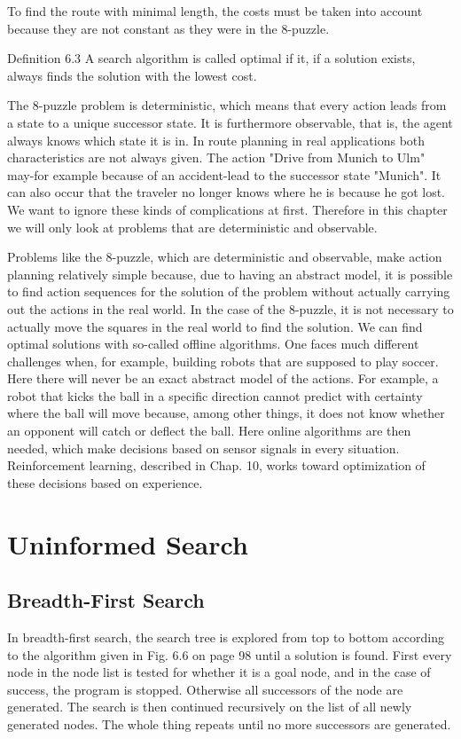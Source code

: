 \documentclass[10pt]{book}
\begin{document}
To find the route with minimal length, the costs must be taken into account because they are not constant as they were in the 8-puzzle.

Definition 6.3 A search algorithm is called optimal if it, if a solution exists, always finds the solution with the lowest cost.

The 8-puzzle problem is deterministic, which means that every action leads from a state to a unique successor state. It is furthermore observable, that is, the agent always knows which state it is in. In route planning in real applications both characteristics are not always given. The action "Drive from Munich to Ulm" may-for example because of an accident-lead to the successor state "Munich". It can also occur that the traveler no longer knows where he is because he got lost. We want to ignore these kinds of complications at first. Therefore in this chapter we will only look at problems that are deterministic and observable.

Problems like the 8-puzzle, which are deterministic and observable, make action planning relatively simple because, due to having an abstract model, it is possible to find action sequences for the solution of the problem without actually carrying out the actions in the real world. In the case of the 8-puzzle, it is not necessary to actually move the squares in the real world to find the solution. We can find optimal solutions with so-called offline algorithms. One faces much different challenges when, for example, building robots that are supposed to play soccer. Here there will never be an exact abstract model of the actions. For example, a robot that kicks the ball in a specific direction cannot predict with certainty where the ball will move because, among other things, it does not know whether an opponent will catch or deflect the ball. Here online algorithms are then needed, which make decisions based on sensor signals in every situation. Reinforcement learning, described in Chap. 10, works toward optimization of these decisions based on experience.

\section{Uninformed Search}
\subsection{Breadth-First Search}
In breadth-first search, the search tree is explored from top to bottom according to the algorithm given in Fig. 6.6 on page 98 until a solution is found. First every node in the node list is tested for whether it is a goal node, and in the case of success, the program is stopped. Otherwise all successors of the node are generated. The search is then continued recursively on the list of all newly generated nodes. The whole thing repeats until no more successors are generated.
\end{document}

